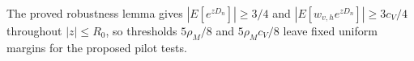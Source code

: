 The proved robustness lemma gives \(|E[e^{zD_n}]|\ge3/4\) and \(|E[w_{v,h}e^{zD_n}]|\ge3c_V/4\) throughout \(|z|\le R_0\), so thresholds \(5\rho_M/8\) and \(5\rho_Mc_V/8\) leave fixed uniform margins for the proposed pilot tests.